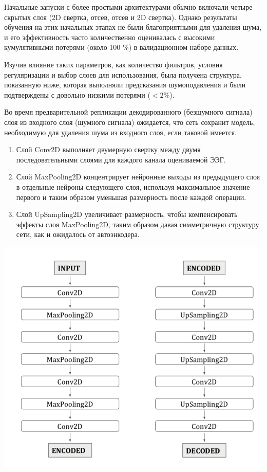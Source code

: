 \documentclass[12pt, a4paper, titlepage]{extreport}
\begin{document}
	Начальные запуски с более простыми архитектурами обычно включали четыре скрытых слоя (2D свертка, отсев, отсев и 2D свертка). Однако результаты обучения на этих начальных этапах не были благоприятными для удаления шума, и его эффективность часто количественно оценивалась с высокими кумулятивными потерями (около 100 \%) в валидационном наборе данных.
	
	Изучив влияние таких параметров, как количество фильтров, условия регуляризации и выбор слоев для использования, была получена структура, показанную ниже, которая выполняли предсказания шумоподавления и были подтверждены с довольно низкими потерями ($< 2\%$).
	
	Во время предварительной репликации декодированного (безшумного сигнала) слоя из входного слоя (шумного сигнала) ожидается, что сеть сохранит модель, необходимую для удаления шума из входного слоя, если таковой имеется.
	\begin{enumerate}
		\item Слой Conv2D выполняет двумерную свертку между двумя последовательными слоями для каждого канала оцениваемой ЭЭГ.
		\item Слой MaxPooling2D концентрирует нейронные выходы из предыдущего слоя в отдельные нейроны следующего слоя, используя максимальное значение первого и таким образом уменьшая размерность после каждой операции.
		\item Слой UpSampling2D увеличивает размерность, чтобы компенсировать эффекты слоя MaxPooling2D, таким образом давая симметричную структуру сети, как и ожидалось от автоэнкодера.
	\end{enumerate}
	\includegraphics[scale=1]{architecture.png}
\end{document}
